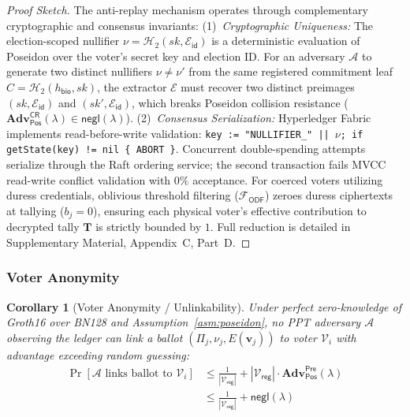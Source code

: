 \documentclass[10pt,letterpaper,journal]{IEEEtran}
\newtheorem{corollary}[theorem]{Corollary}
\begin{document}
\begin{proof}[Proof Sketch]
The anti-replay mechanism operates through complementary cryptographic and consensus invariants:
(1)~\emph{Cryptographic Uniqueness:} The election-scoped nullifier $\nu = \mathcal{H}_2(sk, \mathcal{E}_{\mathsf{id}})$ is a deterministic evaluation of Poseidon over the voter's secret key and election ID. For an adversary $\mathcal{A}$ to generate two distinct nullifiers $\nu \neq \nu'$ from the same registered commitment leaf $C = \mathcal{H}_2(h_{\mathsf{bio}}, sk)$, the extractor $\mathcal{E}$ must recover two distinct preimages $(sk, \mathcal{E}_{\mathsf{id}})$ and $(sk', \mathcal{E}_{\mathsf{id}})$, which breaks Poseidon collision resistance ($\mathbf{Adv}^{\mathsf{CR}}_{\mathsf{Pos}}(\lambda) \in \mathsf{negl}(\lambda)$).
(2)~\emph{Consensus Serialization:} Hyperledger Fabric implements read-before-write validation: \texttt{key := "NULLIFIER\_"\,||\,$\nu$; if getState(key) != nil \{ ABORT \}}. Concurrent double-spending attempts serialize through the Raft ordering service; the second transaction fails MVCC read-write conflict validation with $0\%$ acceptance.
For coerced voters utilizing duress credentials, oblivious threshold filtering ($\mathcal{F}_{\mathsf{ODF}}$) zeroes duress ciphertexts at tallying ($b_j = 0$), ensuring each physical voter's effective contribution to decrypted tally $\mathbf{T}$ is strictly bounded by $1$. Full reduction is detailed in Supplementary Material, Appendix~C, Part~D.
\end{proof}

\subsubsection{Voter Anonymity}
\label{sec:anonymity}

\begin{corollary}[Voter Anonymity / Unlinkability]
\label{thm:anonymity}
Under perfect zero-knowledge of Groth16 over BN128 and Assumption~\ref{asm:poseidon}, no PPT adversary $\mathcal{A}$ observing the ledger can link a ballot $(\Pi_j, \nu_j, E(\mathbf{v}_j))$ to voter $\mathcal{V}_i$ with advantage exceeding random guessing:
\begin{equation}
\label{eq:anonymity-bound}
\begin{split}
  \Pr\left[\mathcal{A}\text{ links ballot to } \mathcal{V}_i\right]
    &\leq \frac{1}{|\mathcal{V}_{\mathsf{reg}}|} + |\mathcal{V}_{\mathsf{reg}}| \cdot \mathbf{Adv}_{\mathsf{Pos}}^{\mathsf{Pre}}(\lambda) \\
    &\leq \frac{1}{|\mathcal{V}_{\mathsf{reg}}|} + \mathsf{negl}(\lambda)
\end{split}
\end{equation}
\end{corollary}
\end{document}
